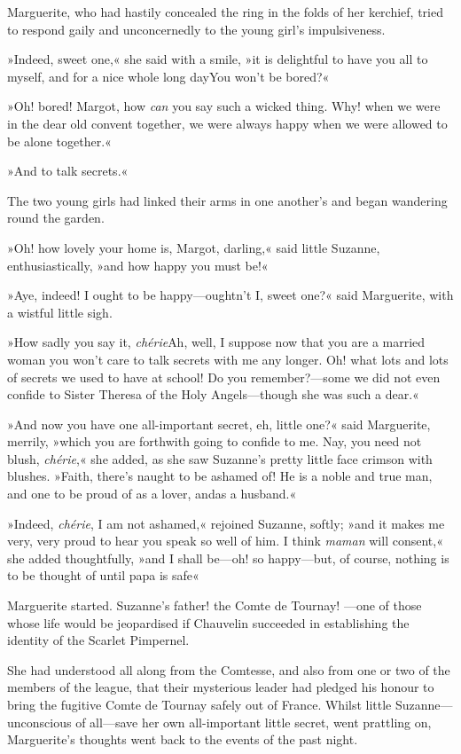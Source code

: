 Marguerite, who had hastily concealed the ring in the folds of her kerchief, tried to respond gaily and unconcernedly to the young girl's impulsiveness.

»Indeed, sweet one,« she said with a smile, »it is delightful to have you all to myself, and for a nice whole long day\textellipsis \allowbreak  You won't be bored?«

»Oh! bored! Margot, how \textit{can} you say such a wicked thing. Why! when we were in the dear old convent together, we were always happy when we were allowed to be alone together.«

»And to talk secrets.«

The two young girls had linked their arms in one another's and began wandering round the garden.

»Oh! how lovely your home is, Margot, darling,« said little Suzanne, enthusiastically, »and how happy you must be!«

»Aye, indeed! I ought to be happy—oughtn't I, sweet one?« said Marguerite, with a wistful little sigh.

»How sadly you say it, \textit{chérie}\textellipsis \allowbreak  Ah, well, I suppose now that you are a married woman you won't care to talk secrets with me any longer. Oh! what lots and lots of secrets we used to have at school! Do you remember?—some we did not even confide to Sister Theresa of the Holy Angels—though she was such a dear.«

»And now you have one all-important secret, eh, little one?« said Marguerite, merrily, »which you are forthwith going to confide to me. Nay, you need not blush, \textit{chérie},« she added, as she saw Suzanne's pretty little face crimson with blushes. »Faith, there's naught to be ashamed of! He is a noble and true man, and one to be proud of as a lover, and\textellipsis \allowbreak  as a husband.«

»Indeed, \textit{chérie}, I am not ashamed,« rejoined Suzanne, softly; »and it makes me very, very proud to hear you speak so well of him. I think \textit{maman} will consent,« she added thoughtfully, »and I shall be—oh! so happy—but, of course, nothing is to be thought of until papa is safe\textellipsis«

Marguerite started. Suzanne's father! the Comte de Tournay! —one of those whose life would be jeopardised if Chauvelin succeeded in establishing the identity of the Scarlet Pimpernel.

She had understood all along from the Comtesse, and also from one or two of the members of the league, that their mysterious leader had pledged his honour to bring the fugitive Comte de Tournay safely out of France. Whilst little Suzanne—unconscious of all—save her own  all-important little secret, went prattling on, Marguerite's thoughts went back to the events of the past night.


